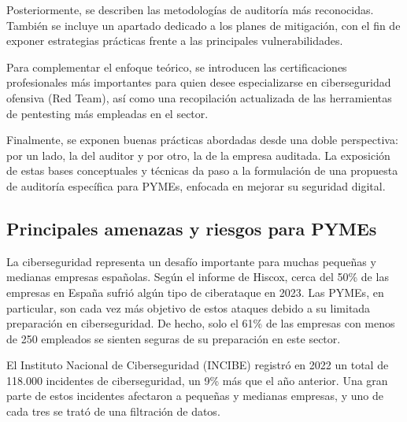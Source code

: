 \documentclass[a4paper, 10pt]{article}
\begin{document}
Posteriormente, se describen las metodologías de auditoría más reconocidas. También se incluye un apartado dedicado a los planes de mitigación, con el fin de exponer estrategias prácticas frente a las principales vulnerabilidades.

\par\vspace{0.5cm}

Para complementar el enfoque teórico, se introducen las certificaciones profesionales más importantes para quien desee especializarse en ciberseguridad ofensiva (Red Team), así como una recopilación actualizada de las herramientas de pentesting más empleadas en el sector.

\par\vspace{0.5cm}

\par\vspace{0.5cm}

Finalmente, se exponen buenas prácticas abordadas desde una doble perspectiva: por un lado, la del auditor y por otro, la de la empresa auditada.
La exposición de estas bases conceptuales y técnicas da paso a la formulación de una propuesta de auditoría específica para PYMEs, enfocada en mejorar su seguridad digital.
















\subsection{Principales amenazas y riesgos para PYMEs}

La ciberseguridad representa un desafío importante para muchas pequeñas y medianas empresas españolas. Según el informe de Hiscox, cerca del 50\% de las empresas en España sufrió algún tipo de ciberataque en 2023. Las PYMEs, en particular, son cada vez más objetivo de estos ataques debido a su limitada preparación en ciberseguridad. De hecho, solo el 61\% de las empresas con menos de 250 empleados se sienten seguras de su preparación en este sector. \cite{hiscox}
\par\vspace{0.5cm}

El Instituto Nacional de Ciberseguridad (INCIBE) registró en 2022 un total de 118.000 incidentes de ciberseguridad, un 9\% más que el año anterior. Una gran parte de estos incidentes afectaron a pequeñas y medianas empresas, y uno de cada tres se trató de una filtración de datos.\cite{incibe2023}
\par\vspace{0.5cm}
\end{document}
